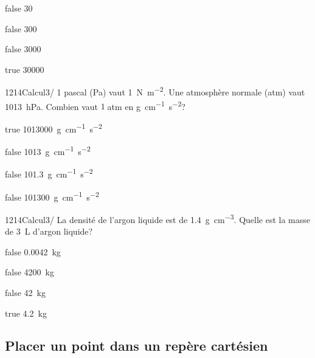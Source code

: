 \documentclass[11pt]{article}
\begin{document}
            \begin{reponses}
            	\item[false] 30
            	\item[false] 300
                \item[false] 3000
                \item[true] 30000
            \end{reponses}
        
        	\begin{question}{1214}{Calcul}{3}{/}
				1 pascal (\si{\pascal}) vaut \SI{1}{\newton\per\meter^2}. Une atmosphère normale (atm) vaut \SI{1013}{\hecto\pascal}. Combien vaut $1\;$atm en \si{\gram.\centi\meter^{-1}.\second^{-2}}?
            \end{question}

            \begin{reponses}
            	\item[true] \SI{1013000}{\gram.\centi\meter^{-1}\second^{-2}}
            	\item[false] \SI{1013}{\gram.\centi\meter^{-1}\second^{-2}}
                \item[false] \SI{101,3}{\gram.\centi\meter^{-1}\second^{-2}}
                \item[false] \SI{101300}{\gram.\centi\meter^{-1}\second^{-2}}
            \end{reponses}

            \begin{question}{1214}{Calcul}{3}{/}
                La densité de l'argon liquide est de \SI{1.4}{\gram\per\centi\meter\cubed}. Quelle est la masse de \SI{3}{\liter} d'argon liquide?
            \end{question}

            \begin{reponses}
                \item[false] \SI{0.0042}{\kilo\gram}
                \item[false] \SI{4200}{\kilo\gram}
                \item[false] \SI{42}{\kilo\gram}
                \item[true] \SI{4.2}{\kilo\gram}
            \end{reponses}
            
        \subsection{Placer un point dans un repère cartésien}
\end{document}
